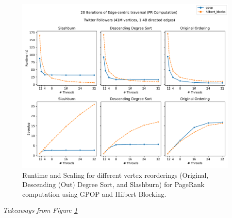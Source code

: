     \newpage
    \begin{figure}[!htb]
    \centering
    \includegraphics[width=5in]{plots/eval/twitter_gpop_illustrative.pdf}
    \caption{Runtime and Scaling for different vertex reorderings (Original, Descending (Out) Degree Sort, and  Slashburn) for PageRank computation using GPOP and Hilbert Blocking.}
    \label{fig:fig-twitter-comp-illustration}   %
    \end{figure}
    
    \textit{Takeaways from Figure \ref{fig:fig-twitter-comp-illustration}}

